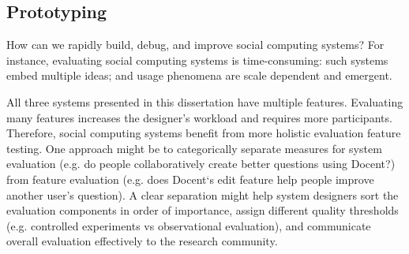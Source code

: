 
\subsection{Prototyping}
How can we rapidly build, debug, and improve social computing systems? For instance, evaluating social computing systems is time-consuming: such systems embed multiple ideas; and usage phenomena are scale dependent and emergent.

All three systems presented in this dissertation have multiple features. Evaluating many features increases the designer's workload and requires more participants. Therefore, social computing systems benefit from more holistic evaluation feature testing. One approach might be to categorically separate measures for system evaluation (e.g. do people collaboratively create better questions using Docent?) from feature evaluation (e.g. does Docent‘s edit feature help people improve another user’s question). A clear separation might help system designers sort the evaluation components in order of importance, assign different quality thresholds (e.g. controlled experiments vs observational evaluation), and communicate overall evaluation effectively to the research community.



